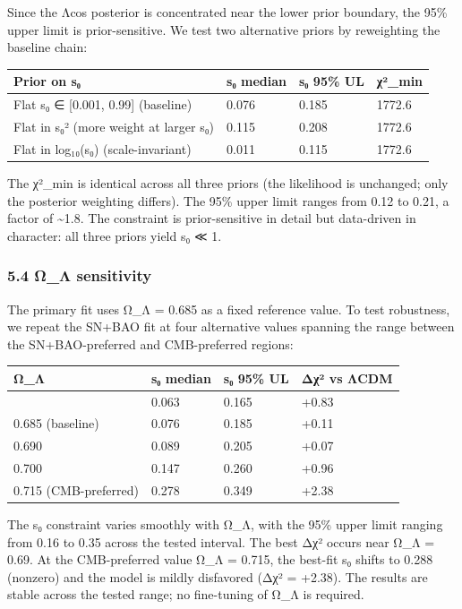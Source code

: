 Since the Λcos posterior is concentrated near the lower prior boundary,
the 95\% upper limit is prior-sensitive. We test two alternative priors
by reweighting the baseline chain:

{\def\LTcaptype{none} %
\begin{longtable}[]{@{}llll@{}}
\toprule\noalign{}
Prior on s₀ & s₀ median & s₀ 95\% UL & χ²\_min \\
\midrule\noalign{}
\endhead
\bottomrule\noalign{}
\endlastfoot
Flat s₀ ∈ {[}0.001, 0.99{]} (baseline) & 0.076 & 0.185 & 1772.6 \\
Flat in s₀² (more weight at larger s₀) & 0.115 & 0.208 & 1772.6 \\
Flat in log₁₀(s₀) (scale-invariant) & 0.011 & 0.115 & 1772.6 \\
\end{longtable}
}

The χ²\_min is identical across all three priors (the likelihood is
unchanged; only the posterior weighting differs). The 95\% upper limit
ranges from 0.12 to 0.21, a factor of \textasciitilde1.8. The constraint
is prior-sensitive in detail but data-driven in character: all three
priors yield s₀ ≪ 1.

\subsubsection{5.4 Ω\_Λ sensitivity}\label{ux3c9_ux3bb-sensitivity}

The primary fit uses Ω\_Λ = 0.685 as a fixed reference value. To test
robustness, we repeat the SN+BAO fit at four alternative values spanning
the range between the SN+BAO-preferred and CMB-preferred regions:

{\def\LTcaptype{none} %
\begin{longtable}[]{@{}llll@{}}
\toprule\noalign{}
Ω\_Λ & s₀ median & s₀ 95\% UL & Δχ² vs ΛCDM \\
\midrule\noalign{}
\endhead
\bottomrule\noalign{}
\endlastfoot
0.680 & 0.063 & 0.165 & +0.83 \\
0.685 (baseline) & 0.076 & 0.185 & +0.11 \\
0.690 & 0.089 & 0.205 & +0.07 \\
0.700 & 0.147 & 0.260 & +0.96 \\
0.715 (CMB-preferred) & 0.278 & 0.349 & +2.38 \\
\end{longtable}
}

The s₀ constraint varies smoothly with Ω\_Λ, with the 95\% upper limit
ranging from 0.16 to 0.35 across the tested interval. The best Δχ²
occurs near Ω\_Λ = 0.69. At the CMB-preferred value Ω\_Λ = 0.715, the
best-fit s₀ shifts to 0.288 (nonzero) and the model is mildly disfavored
(Δχ² = +2.38). The results are stable across the tested range; no
fine-tuning of Ω\_Λ is required.

